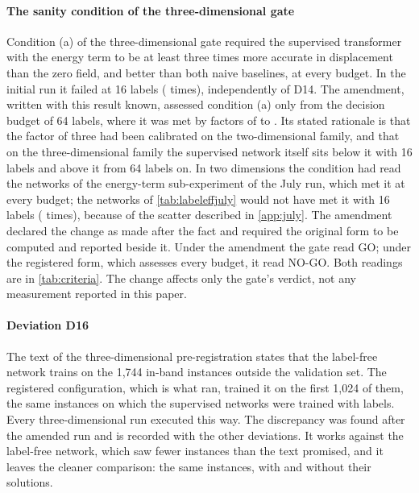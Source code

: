 \paragraph{The sanity condition of the three-dimensional gate}
Condition (a) of the three-dimensional gate required the supervised transformer with the
energy term to be at least three times more accurate in displacement than the zero field,
and better than both naive baselines, at every budget. In the initial run it failed at 16
labels (\numGTwoSanitySixteen{} times), independently of D14. The amendment, written with
this result known, assessed condition (a) only from the decision budget of 64 labels, where
it was met by factors of \numGTwoSanitySixtyFour{} to \numGTwoSanityMax{}. Its stated
rationale is that the factor of three had been calibrated on the two-dimensional family,
and that on the three-dimensional family the supervised network itself sits below it with
16 labels and above it from 64 labels on. In two dimensions the condition had read the
networks of the energy-term sub-experiment of the July run, which met it at every budget;
the networks of \cref{tab:labeleffjuly} would not have met it with 16 labels
(\numGOneSanityTableSixteen{} times), because of the scatter described in \ref{app:july}.
The amendment declared the change as made after the fact and required the original form to
be computed and reported beside it. Under the amendment the gate read GO; under the
registered form, which assesses every budget, it read NO-GO. Both readings are in
\cref{tab:criteria}. The change affects only the gate's verdict, not any measurement
reported in this paper.

\paragraph{Deviation D16}
The text of the three-dimensional pre-registration states that the label-free network
trains on the 1,744 in-band instances outside the validation set. The registered
configuration, which is what ran, trained it on the first 1,024 of them, the same instances
on which the supervised networks were trained with labels. Every three-dimensional run
executed this way. The discrepancy was found after the amended run and is recorded with the
other deviations. It works against the label-free network, which saw fewer instances than
the text promised, and it leaves the cleaner comparison: the same instances, with and
without their solutions.

